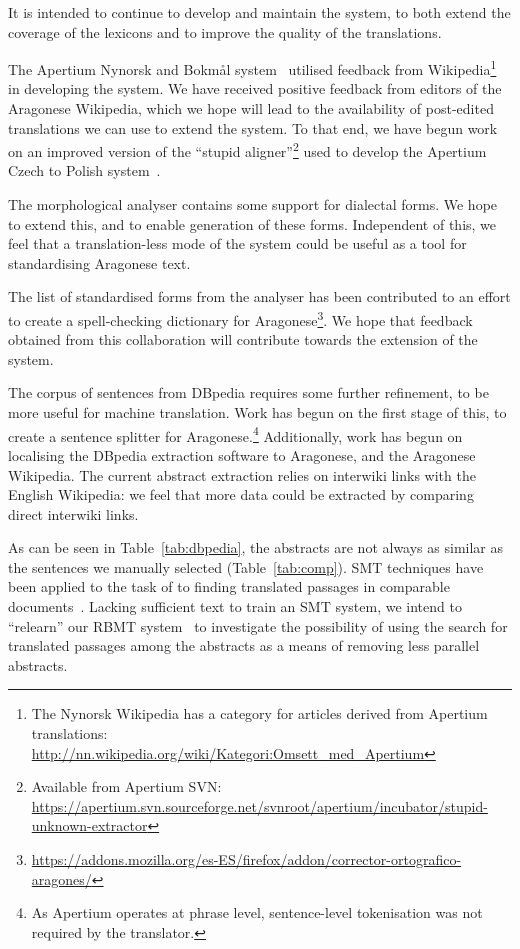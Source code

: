 \documentclass[10pt,a4paper,twocolumn]{article}
\begin{document}
  It is intended to continue to develop and maintain the system, to both extend the coverage of the lexicons and to improve the quality of the translations.
  
  The Apertium Nynorsk and Bokmål system~\cite{Unhammer} utilised feedback from Wikipedia\footnote{The Nynorsk Wikipedia has a category for articles derived from Apertium translations: {\small \url{http://nn.wikipedia.org/wiki/Kategori:Omsett_med_Apertium}}} in developing the system. We have received positive feedback from editors of the Aragonese Wikipedia, which we hope will lead to the availability of post-edited translations we can use to extend the system. 
To that end, we have begun work on an improved version of the ``stupid aligner''\footnote{Available from Apertium SVN: \url{https://apertium.svn.sourceforge.net/svnroot/apertium/incubator/stupid-unknown-extractor}} used to develop the Apertium Czech to Polish system~\cite{Ruth}.
  
  The morphological analyser contains some support for dialectal forms. We hope to extend this, and to enable generation of these forms. Independent of this, we feel that a translation-less mode of the system could be useful as a tool for standardising Aragonese text.
  
  The list of standardised forms from the analyser has been contributed to an effort to create a spell-checking dictionary for Aragonese\footnote{\url{https://addons.mozilla.org/es-ES/firefox/addon/corrector-ortografico-aragones/}}. We hope that feedback obtained from this collaboration will contribute towards the extension of the system.

  The corpus of sentences from DBpedia requires some further refinement, to be more useful for machine translation. Work has begun on the first stage of this, to create a sentence splitter for Aragonese.\footnote{As Apertium operates at phrase level, sentence-level tokenisation was not required by the translator.} Additionally, work has begun on localising the DBpedia extraction software to Aragonese, and the Aragonese Wikipedia. The current abstract extraction relies on interwiki links with the English Wikipedia: we feel that more data could be extracted by comparing direct interwiki links.

  As can be seen in Table~\ref{tab:dbpedia}, the abstracts are not always as similar as the sentences we manually selected (Table~\ref{tab:comp}). SMT techniques have been applied to the task of to finding translated passages in comparable documents~\cite{sanchez-martinez11a}. Lacking sufficient text to train an SMT system, we intend to ``relearn'' our RBMT system~\cite{relearn} to investigate the possibility of using the search for translated passages among the abstracts as a means of removing less parallel abstracts.
\end{document}
